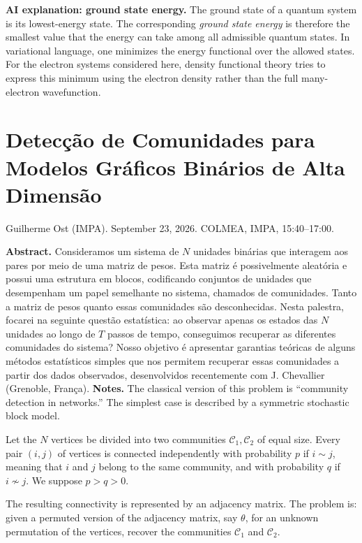 \medskip\noindent
{\bf AI explanation: ground state energy.}
The ground state of a quantum system is its
lowest-energy state. The corresponding
{\it ground state energy} is therefore the
smallest value that the energy can take
among all admissible quantum states. In
variational language, one minimizes the
energy functional over the allowed states.
For the electron systems considered here,
density functional theory tries to express
this minimum using the electron density
rather than the full many-electron
wavefunction.

\section{Detecção de Comunidades para
Modelos Gráficos Binários de Alta Dimensão}
\label{section-ost-colmea-2026}

\noindent
Guilherme Ost (IMPA).
September 23, 2026.
COLMEA, IMPA, 15:40--17:00.

\medskip\noindent
{\bf Abstract.}
Consideramos um sistema de $N$ unidades
binárias que interagem aos pares por meio
de uma matriz de pesos. Esta matriz é
possivelmente aleatória e possui uma
estrutura em blocos, codificando conjuntos
de unidades que desempenham um papel
semelhante no sistema, chamados de
comunidades. Tanto a matriz de pesos quanto
essas comunidades são desconhecidas. Nesta
palestra, focarei na seguinte questão
estatística: ao observar apenas os estados
das $N$ unidades ao longo de $T$ passos de
tempo, conseguimos recuperar as diferentes
comunidades do sistema? Nosso objetivo é
apresentar garantias teóricas de alguns
métodos estatísticos simples que nos
permitem recuperar essas comunidades a
partir dos dados observados, desenvolvidos
recentemente com J. Chevallier (Grenoble,
França).
\medskip\noindent
{\bf Notes.}
The classical version of this problem is
``community detection in networks.'' The
simplest case is described by a symmetric
stochastic block model.

Let the $N$ vertices be divided into two
communities
$
\mathcal{C}_1,\mathcal{C}_2
$
of equal size. Every pair $(i,j)$ of
vertices is connected independently with
probability $p$ if $i\sim j$, meaning that
$i$ and $j$ belong to the same community,
and with probability $q$ if $i\not\sim j$.
We suppose
$
p>q>0.
$

The resulting connectivity is represented
by an adjacency matrix. The problem is:
given a permuted version of the adjacency
matrix, say $\theta$, for an unknown
permutation of the vertices, recover the
communities $\mathcal{C}_1$ and
$\mathcal{C}_2$.

